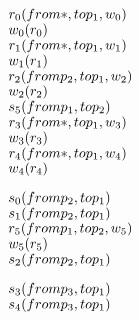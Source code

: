 \newcommand{\reduce}[1]{\ensuremath{\rightarrow_{#1}}}

\newsavebox{\boxTZero}
\begin{lrbox}{\boxTZero}
\begin{minipage}[t]{0.4\linewidth}
\large
\begin{alltt}
\(r\sb{0}(from \ast, to p\sb{1}, w\sb{0})\)
\(w\sb{0}(r\sb{0})\)
\(r\sb{1}(from \ast, to p\sb{1}, w\sb{1})\)
\(w\sb{1}(r\sb{1})\)
\(r\sb{2}(from p\sb{2}, to p\sb{1}, w\sb{2})\)
\(w\sb{2}(r\sb{2})\)
\(s\sb{5}(from p\sb{1}, to p\sb{2})\)
\(r\sb{3}(from \ast, to p\sb{1}, w\sb{3})\)
\(w\sb{3}(r\sb{3})\)
\(r\sb{4}(from \ast, to p\sb{1}, w\sb{4})\)
\(w\sb{4}(r\sb{4})\)
\end{alltt}
\end{minipage}
\end{lrbox}

\newsavebox{\boxTOne}
\begin{lrbox}{\boxTOne}
\begin{minipage}[t]{0.4\linewidth}
\large
\begin{alltt}
\(s\sb{0}(from p\sb{2}, to p\sb{1})\)
\(s\sb{1}(from p\sb{2}, to p\sb{1})\)
\(r\sb{5}(from p\sb{1}, to p\sb{2}, w\sb{5})\)
\(w\sb{5}(r\sb{5})\)
\(s\sb{2}(from p\sb{2}, to p\sb{1})\)
\end{alltt}
\end{minipage}
\end{lrbox}

\newsavebox{\boxTTwo}
\begin{lrbox}{\boxTTwo}
\begin{minipage}[t]{0.4\linewidth}
\large
\begin{alltt}
\(s\sb{3}(from p\sb{3}, to p\sb{1})\)
\(s\sb{4}(from p\sb{3}, to p\sb{1})\)
\end{alltt}
\end{minipage}
\end{lrbox}


\newcommand\examplefigone{
\begin{figure*}[tb]
\begin{center}
\setlength{\tabcolsep}{2pt}
\begin{tabular}[t]{c|c|c}
$\mathit{p_1}$ & $\mathit{p_2}$ & $\mathit{p_3}$ \\
\hline
\scalebox{0.75}{\usebox{\boxTZero}}&
\scalebox{0.75}{\usebox{\boxTOne}} &
\scalebox{0.75}{\usebox{\boxTTwo}}
\end{tabular}
\end{center}
\caption{A simple concurrent trace program.}
\label{fig:example}
\end{figure*}
}

